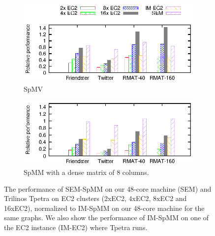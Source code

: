 \begin{figure}
	\footnotesize
	\centering
	\begin{subfigure}[b]{0.5\textwidth}
		\centering
		\includegraphics[scale=1]{SpMM_figs/SpMV-EC2.eps}
		\vspace{-5pt}
		\caption{SpMV}
		\label{perf:ec2:spmv}
	\end{subfigure}
	\begin{subfigure}[b]{0.5\textwidth}
		\centering
		\includegraphics[scale=1]{SpMM_figs/SpMM-EC2.eps}
		\vspace{-5pt}
		\caption{SpMM with a dense matrix of 8 columns.}
		\label{perf:ec2:spmm8}
	\end{subfigure}
	\vspace{3pt}
	\caption{The performance of SEM-SpMM on our 48-core machine (SEM) and
		Trilinos Tpetra on EC2 clusters (2xEC2, 4xEC2, 8xEC2 and 16xEC2),
		normalized to IM-SpMM on our 48-core machine for the same graphs.
		We also show the performance of IM-SpMM on
	one of the EC2 instance (IM-EC2) where Tpetra runs.}
	\label{perf:ec2}
\end{figure}

